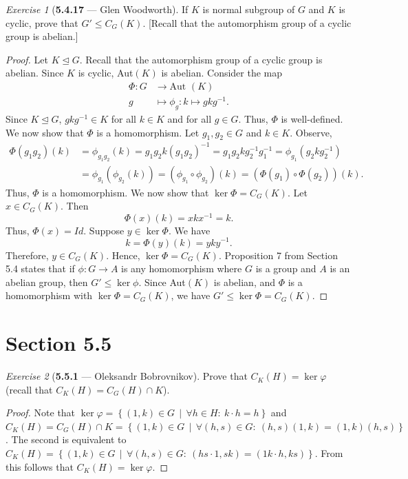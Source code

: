 \documentclass[12pt]{amsart}
\theoremstyle{remark}
\newtheorem*{exercise}{Exercise}%
\theoremstyle{mycomment}
\def\midd{\,\middle\vert\, }
\begin{document}
\begin{exercise}[\textbf{5.4.17} --- Glen Woodworth] If $K$ is normal subgroup of $G$ and $K$ is cyclic, prove that $G'\le C_G(K)$. [Recall that the automorphism group of a cyclic group is abelian.]
  \begin{proof} Let $K\trianglelefteq G$. Recall that the automorphism group of a cyclic group is abelian. Since $K$ is cyclic, Aut$(K)$ is abelian. Consider the map
  \begin{align*}
  \Phi:G&\rightarrow \text{Aut }(K)\\
  g&\mapsto\phi_g:k\mapsto gkg^{-1}.\end{align*}
  Since $K\trianglelefteq G$, $gkg^{-1}\in K$ for all $k\in K$ and for all $g\in G$. Thus, $\Phi$ is well-defined. We now show that $\Phi$ is a homomorphism. Let $g_1,g_2\in G$ and $k\in K$. Observe,
  \begin{align*}
  \Phi(g_1g_2)(k)&=\phi_{g_1g_2}(k)=g_1g_2k(g_1g_2)^{-1}=g_1g_2kg_2^{-1}g_1^{-1}=\phi_{g_1}(g_2kg_2^{-1})\\
  &=\phi_{g_1}(\phi_{g_2}(k))=(\phi_{g_1}\circ\phi_{g_2})(k)=(\Phi(g_1)\circ\Phi(g_2))(k).
  \end{align*}
Thus, $\Phi$ is a homomorphism. We now show that $\ker\Phi= C_G(K)$. Let $x\in C_G(K)$. Then \[\Phi(x)(k)=xkx^{-1}=k.\]
Thus, $\Phi(x)=Id$. Suppose $y\in\ker\Phi$. We have \[k=\Phi(y)(k)=yky^{-1}.\] Therefore, $y\in C_G(K)$. Hence, $\ker\Phi=C_G(K)$. Proposition 7 from Section 5.4 states that if $\phi:G\rightarrow A$ is any homomorphism where $G$ is a group and $A$ is an abelian group, then $G'\le\ker\phi$. Since Aut$(K)$ is abelian, and $\Phi$ is a homomorphism with $\ker\Phi=C_G(K)$, we have $G'\le\ker\Phi=C_G(K)$.
  \end{proof}
\end{exercise}
\vspace{.15in}





\section*{Section 5.5}


\begin{exercise}[\textbf{5.5.1} --- Oleksandr Bobrovnikov]
  Prove that $C_K(H)=\ker\varphi$ (recall that $C_K(H)=C_G(H)\cap K$).
  \begin{proof}
    Note that $\ker \varphi=\left\{ (1,k)\in G\midd \forall h\in H:~k\cdot h =h \right\}$ and\\
    $C_K(H)=C_G(H)\cap K=\left\{ (1,k)\in G\midd\forall (h,s)\in G:~ (h,s)(1,k)=(1,k)(h,s)  \right\}$. The second is equivalent to
    $C_K(H)=\left\{ (1,k)\in G\midd\forall (h,s)\in G:~ (hs\cdot 1,sk)=(1k\cdot h,ks)  \right\}$.
    From this follows that $C_K(H)=\ker\varphi$.
  \end{proof}
\end{exercise}
\vspace{.15in}
\end{document}
